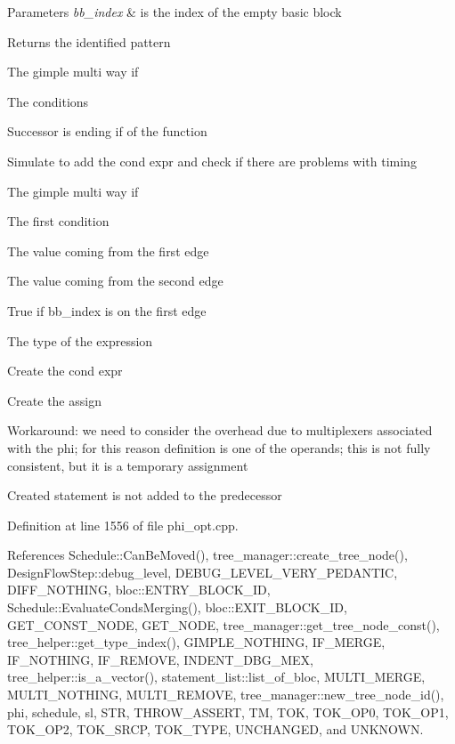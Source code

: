 \begin{DoxyParams}{Parameters}
{\em bb\+\_\+index} & is the index of the empty basic block \\
\hline
\end{DoxyParams}
\begin{DoxyReturn}{Returns}
the identified pattern 
\end{DoxyReturn}
The gimple multi way if

The conditions

Successor is ending if of the function

Simulate to add the cond expr and check if there are problems with timing

The gimple multi way if

The first condition

The value coming from the first edge

The value coming from the second edge

True if bb\+\_\+index is on the first edge

The type of the expression

Create the cond expr

Create the assign

Workaround\+: we need to consider the overhead due to multiplexers associated with the phi; for this reason definition is one of the operands; this is not fully consistent, but it is a temporary assignment

Created statement is not added to the predecessor 

Definition at line 1556 of file phi\+\_\+opt.\+cpp.



References Schedule\+::\+Can\+Be\+Moved(), tree\+\_\+manager\+::create\+\_\+tree\+\_\+node(), Design\+Flow\+Step\+::debug\+\_\+level, D\+E\+B\+U\+G\+\_\+\+L\+E\+V\+E\+L\+\_\+\+V\+E\+R\+Y\+\_\+\+P\+E\+D\+A\+N\+T\+IC, D\+I\+F\+F\+\_\+\+N\+O\+T\+H\+I\+NG, bloc\+::\+E\+N\+T\+R\+Y\+\_\+\+B\+L\+O\+C\+K\+\_\+\+ID, Schedule\+::\+Evaluate\+Conds\+Merging(), bloc\+::\+E\+X\+I\+T\+\_\+\+B\+L\+O\+C\+K\+\_\+\+ID, G\+E\+T\+\_\+\+C\+O\+N\+S\+T\+\_\+\+N\+O\+DE, G\+E\+T\+\_\+\+N\+O\+DE, tree\+\_\+manager\+::get\+\_\+tree\+\_\+node\+\_\+const(), tree\+\_\+helper\+::get\+\_\+type\+\_\+index(), G\+I\+M\+P\+L\+E\+\_\+\+N\+O\+T\+H\+I\+NG, I\+F\+\_\+\+M\+E\+R\+GE, I\+F\+\_\+\+N\+O\+T\+H\+I\+NG, I\+F\+\_\+\+R\+E\+M\+O\+VE, I\+N\+D\+E\+N\+T\+\_\+\+D\+B\+G\+\_\+\+M\+EX, tree\+\_\+helper\+::is\+\_\+a\+\_\+vector(), statement\+\_\+list\+::list\+\_\+of\+\_\+bloc, M\+U\+L\+T\+I\+\_\+\+M\+E\+R\+GE, M\+U\+L\+T\+I\+\_\+\+N\+O\+T\+H\+I\+NG, M\+U\+L\+T\+I\+\_\+\+R\+E\+M\+O\+VE, tree\+\_\+manager\+::new\+\_\+tree\+\_\+node\+\_\+id(), phi, schedule, sl, S\+TR, T\+H\+R\+O\+W\+\_\+\+A\+S\+S\+E\+RT, TM, T\+OK, T\+O\+K\+\_\+\+O\+P0, T\+O\+K\+\_\+\+O\+P1, T\+O\+K\+\_\+\+O\+P2, T\+O\+K\+\_\+\+S\+R\+CP, T\+O\+K\+\_\+\+T\+Y\+PE, U\+N\+C\+H\+A\+N\+G\+ED, and U\+N\+K\+N\+O\+WN.



